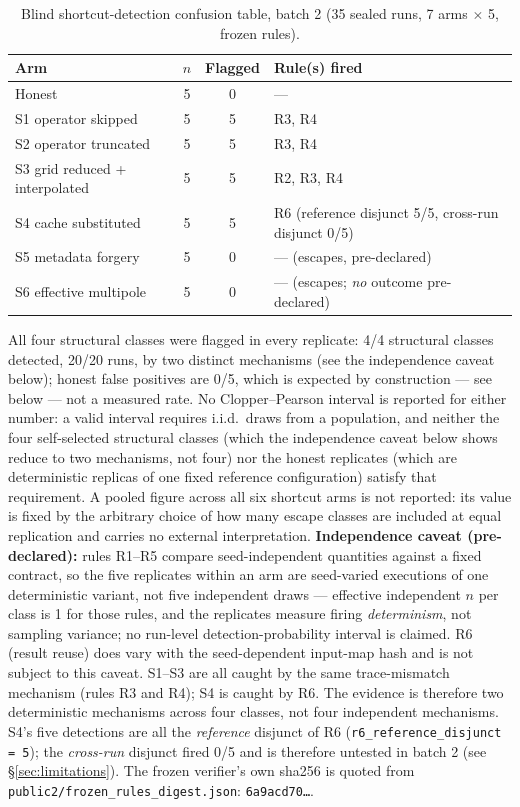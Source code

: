 \documentclass[11pt]{article}
\begin{document}
\begin{table}[h]
\centering
\caption{Blind shortcut-detection confusion table, batch 2 (35 sealed runs, 7 arms \(\times\) 5, frozen rules).}
\label{tab:blind-results}
\begin{tabular}{@{}lccl@{}}
\toprule
Arm & \(n\) & Flagged & Rule(s) fired \\
\midrule
Honest & 5 & 0 & --- \\
S1 operator skipped & 5 & 5 & R3, R4 \\
S2 operator truncated & 5 & 5 & R3, R4 \\
S3 grid reduced + interpolated & 5 & 5 & R2, R3, R4 \\
S4 cache substituted & 5 & 5 & R6 (reference disjunct 5/5, cross-run disjunct 0/5) \\
S5 metadata forgery & 5 & 0 & --- (escapes, pre-declared) \\
S6 effective multipole & 5 & 0 & --- (escapes; \emph{no} outcome pre-declared) \\
\bottomrule
\end{tabular}
\end{table}

All four structural classes were flagged in every replicate: 4/4 structural
classes detected, 20/20 runs, by two distinct mechanisms (see the
independence caveat below); honest false positives are
0/5, which is expected by construction --- see below --- not a measured rate.
No Clopper--Pearson interval is reported for either number: a valid interval
requires i.i.d.\ draws from a population, and neither the four
self-selected structural classes (which the independence caveat below shows
reduce to two mechanisms, not four) nor the honest replicates (which are
deterministic replicas of one fixed reference configuration) satisfy that
requirement. A pooled figure across all six shortcut arms is not reported: its value
is fixed by the arbitrary choice of how many escape classes are included at
equal replication and carries no external interpretation. \textbf{Independence
caveat (pre-declared):}
rules R1--R5 compare seed-independent quantities against a fixed contract, so
the five replicates within an arm are seed-varied executions of one
deterministic variant, not five independent draws --- effective independent
\(n\) per class is 1 for those rules, and the replicates measure firing
\emph{determinism}, not sampling variance; no run-level detection-probability
interval is claimed. R6 (result reuse) does vary
with the seed-dependent input-map hash and is not subject to this caveat.
S1--S3 are all caught by the same trace-mismatch mechanism (rules R3 and R4);
S4 is caught by R6. The evidence is therefore two deterministic mechanisms
across four classes, not four independent mechanisms. S4's five detections
are all the \emph{reference} disjunct of R6 (\texttt{r6\_reference\_disjunct
= 5}); the \emph{cross-run} disjunct fired 0/5 and is therefore untested in
batch 2 (see \S\ref{sec:limitations}).
The frozen verifier's own sha256 is quoted from
\texttt{public2/frozen\_rules\_digest.json}: \texttt{6a9acd70\ldots}.
\end{document}
